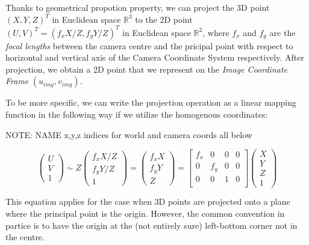 \documentclass[a4paper]{report}
\numberwithin{figure}{section}
\begin{document}
Thanks to geometrical propotion property, we can project 
the 3D point $(X, Y, Z)^T$ in Euclidean space $\mathbb{R}^3$
to the 2D point $(U,V)^T = (f_xX/Z, f_yY/Z)^T$ in Euclidean space $\mathbb{R}^2$, 
where $f_x$ and $f_y$ are the \textit{focal lengths} 
between the camera centre and the pricipal 
point with respect to horizontal and vertical axis of the Camera Coordinate 
System respectively.
After projection, we obtain a 2D 
point that we represent on the 
\textit{Image Coordinate Frame} $(u_{img},v_{img})$.

To be more specific,
we can write the projection operation as a linear mapping function 
in the following way if we utilize the homogenous coordinates:

NOTE: NAME x,y,z indices for world and camera coords all below

\begin{equation}
  \begin{pmatrix}
    U\\
    V\\
    1
  \end{pmatrix}
  \sim
  Z
  \begin{pmatrix}
    f_xX/Z\\
    f_yY/Z\\
    1
  \end{pmatrix}
  =
  \begin{pmatrix}
    f_xX\\
    f_yY\\
    Z
  \end{pmatrix}
  =
  \begin{bmatrix}
    f_x & 0 & 0 & 0\\
    0 & f_y & 0 & 0\\
    0 & 0 & 1 & 0\\
  \end{bmatrix}
  \begin{pmatrix}
    X\\
    Y\\
    Z\\
    1
  \end{pmatrix}
\end{equation} \label{eq:proj_func_w_f}

This equation applies for the case when 3D points are 
projected onto a plane where the principal point is the origin. 
However, the common convention in partice 
is to have the origin at the (not entirely sure) left-bottom corner not in the centre.
\end{document}
